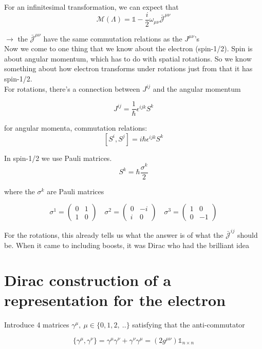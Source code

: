 \documentclass[11pt]{article}
\begin{document}
	For an infinitesimal transformation, we can expect that \[ \mathcal{M}(\Lambda) = \mathbb{1} - \frac{i}{2} \omega_{\mu\nu} \bar{\mathcal{J}}^{\mu\nu} \] 

	$\rightarrow$ the $\bar{\mathcal{J}}^{\mu\nu}$ have the same commutation relations as the $J^{\mu\nu}$'s\\

	Now we come to one thing that we know about the electron (spin-1/2). Spin is about angular momentum, which has to do with spatial rotations. So we know something about how electron transforms under rotations just from that it has spin-1/2.\\

	For rotations, there's a connection between $J^{ij}$ and the angular momentum
	
	\[ J^{ij} = \frac{1}{\hbar}\epsilon^{ijk} S^{k}\]

for angular momenta, commutation relations: \[ [S^i, S^j] = i \hbar \epsilon^{ijk} S^k\]

	In spin-1/2 we use Pauli matrices. \[ S^k = \hbar \frac{\sigma^k}{2}\]
	
	where the $\sigma^k$ are Pauli matrices
	
	\[ \sigma^1 = \begin{pmatrix}
		0 & 1 \\ 1 & 0
	\end{pmatrix} \quad \sigma^2 = \begin{pmatrix}
	0 & -i \\ i & 0
\end{pmatrix} \quad \sigma^3 = \begin{pmatrix}
1 & 0 \\ 0 & -1
\end{pmatrix}\]

For the rotations, this already tells us what the answer is of what the $\bar{\mathcal{J}}^{ij}$ should be. When it came to including boosts, it was Dirac who had the brilliant idea

\section*{Dirac construction of a representation for the electron}

Introduce 4 matrices $\gamma^\mu,\ \mu \in \{0, 1, 2,\ ..\}$ satisfying that the anti-commutator

\[ \{ \gamma^\mu, \gamma^\nu \} = \gamma^\mu\gamma^\nu + \gamma^\nu\gamma^\mu =  (2g^{\mu\nu})\mathbb{1}_{n\times n} \]
\end{document}
